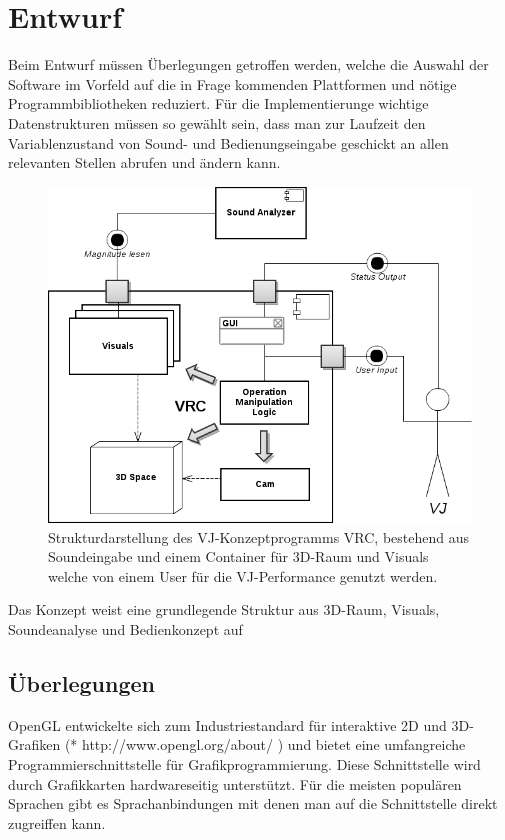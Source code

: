 \section{Entwurf}

Beim Entwurf m\"ussen \"Uberlegungen getroffen werden, welche die Auswahl der Software im Vorfeld auf
die in Frage kommenden Plattformen und n\"otige Programmbibliotheken reduziert. F\"ur die Implementierunge
wichtige Datenstrukturen m\"ussen so gew\"ahlt sein, dass man zur Laufzeit den Variablenzustand von Sound-
und Bedienungseingabe geschickt an allen relevanten Stellen abrufen und \"andern kann.

\begin{figure}[h!]
    \centering
    \includegraphics[width=1\textwidth]{pictures/vrc-component1.png}
    \caption{Strukturdarstellung des VJ-Konzeptprogramms VRC, bestehend aus Soundeingabe und einem Container f\"ur
    3D-Raum und Visuals welche von einem User f\"ur die VJ-Performance genutzt werden.}
\end{figure}

Das Konzept weist eine grundlegende Struktur aus 3D-Raum, Visuals, Soundeanalyse und Bedienkonzept auf


\subsection{\"Uberlegungen}

OpenGL entwickelte sich zum Industriestandard f\"ur interaktive 2D und 3D-Grafiken (* http://www.opengl.org/about/ )
und bietet eine umfangreiche Programmierschnittstelle f\"ur Grafikprogrammierung. Diese Schnittstelle wird durch
Grafikkarten hardwareseitig unterst\"utzt. F\"ur die meisten popul\"aren Sprachen gibt es Sprachanbindungen mit denen
man auf die Schnittstelle direkt zugreiffen kann. 

